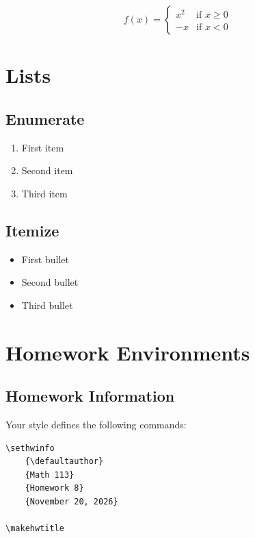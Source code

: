 \documentclass{article}
\begin{document}
\[
    f(x)=
    \begin{cases}
        x^2 & \text{if }x\geq 0 \\
        -x & \text{if }x<0
    \end{cases}
\]


\section{Lists}

\subsection{Enumerate}

\begin{enumerate}
    \item First item
    \item Second item
    \item Third item
\end{enumerate}

\subsection{Itemize}

\begin{itemize}
    \item First bullet
    \item Second bullet
    \item Third bullet
\end{itemize}


\section{Homework Environments}

\subsection{Homework Information}

Your style defines the following commands:

\begin{verbatim}
\sethwinfo
    {\defaultauthor}
    {Math 113}
    {Homework 8}
    {November 20, 2026}

\makehwtitle
\end{verbatim}
\end{document}
